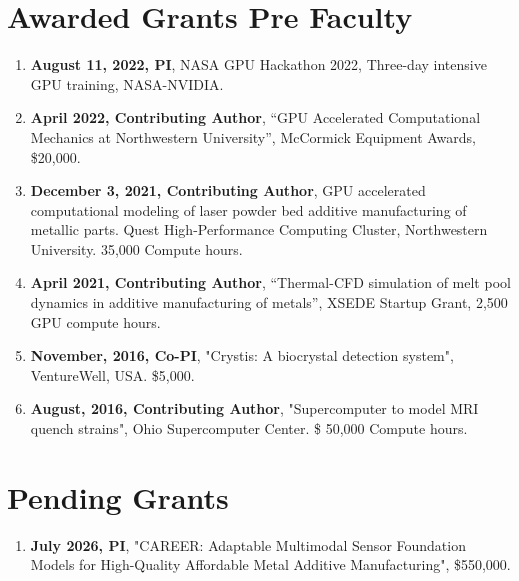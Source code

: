 \documentclass[11pt, letterpaper]{article}
\begin{document}
\section{Awarded Grants Pre Faculty}
    \begin{enumerate}[label=\arabic*., itemsep=-1pt, topsep=2pt]    
        \item \textbf{August 11, 2022, PI}, NASA GPU Hackathon 2022, Three-day intensive GPU training, NASA-NVIDIA.
        \item \textbf{April 2022, Contributing Author}, “GPU Accelerated Computational Mechanics at Northwestern University”, McCormick Equipment Awards, \$20,000.
        \item \textbf{December 3, 2021, Contributing Author}, GPU accelerated computational modeling of laser powder bed additive manufacturing of metallic parts. Quest High-Performance Computing Cluster, Northwestern University. 35,000 Compute hours.
        \item \textbf{April 2021, Contributing Author}, “Thermal-CFD simulation of melt pool dynamics in additive manufacturing of metals”, XSEDE Startup Grant, 2,500 GPU compute hours.
        \item \textbf{November, 2016, Co-PI}, "Crystis: A biocrystal detection system", VentureWell, USA. \$5,000.
        \item \textbf{August, 2016, Contributing Author}, "Supercomputer to model MRI quench strains", Ohio Supercomputer Center. \$ 50,000 Compute hours.
    \end{enumerate}
\ifdefined\isinternal
\section{Pending Grants}
    \begin{enumerate}[label=\arabic*., itemsep=-1pt, topsep=2pt]
        \item \textbf{July 2026, PI}, "CAREER: Adaptable Multimodal Sensor Foundation Models for High-Quality Affordable Metal Additive Manufacturing", \$550,000.
    \end{enumerate}
\end{document}
